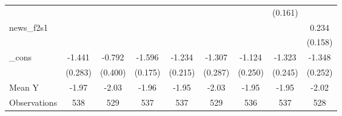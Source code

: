 {\begin{tabular}{l*{8}{c}}
            &                     &                     &                     &                     &                     &                     &     (0.161)         &                     \\
\addlinespace
news\_f2s1   &                     &                     &                     &                     &                     &                     &                     &       0.234         \\
            &                     &                     &                     &                     &                     &                     &                     &     (0.158)         \\
\addlinespace
\_cons      &      -1.441\sym{***}&      -0.792\sym{*}  &      -1.596\sym{***}&      -1.234\sym{***}&      -1.307\sym{***}&      -1.124\sym{***}&      -1.323\sym{***}&      -1.348\sym{***}\\
            &     (0.283)         &     (0.400)         &     (0.175)         &     (0.215)         &     (0.287)         &     (0.250)         &     (0.245)         &     (0.252)         \\
\midrule
Mean Y      &       -1.97         &       -2.03         &       -1.96         &       -1.95         &       -2.03         &       -1.95         &       -1.95         &       -2.02         \\
Observations&         538         &         529         &         537         &         537         &         529         &         536         &         537         &         528         \\
\bottomrule
\end{tabular}
}
